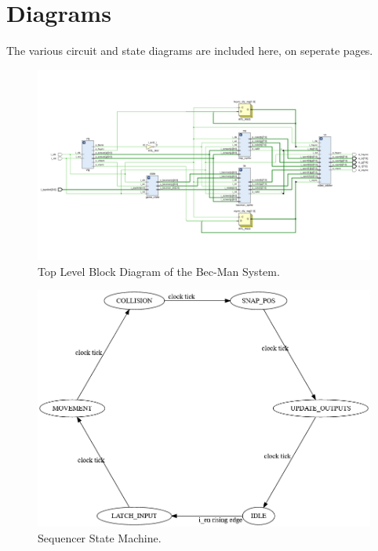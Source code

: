 \documentclass[12pt]{article}
\begin{document}
\section{Diagrams}
The various circuit and state diagrams are included here, on seperate pages.

\begin{figure}
    \includegraphics[width=\textwidth]{TopLevelDiagram.png}
    \caption{Top Level Block Diagram of the Bec-Man System.}
    \label{fig:LandscapeFigure}
\end{figure}

\begin{figure}
    \includegraphics[width=\textwidth]{Sequencer.png}
    \caption{Sequencer State Machine.}
    \label{fig:LandscapeFigure}
\end{figure}
\end{document}
